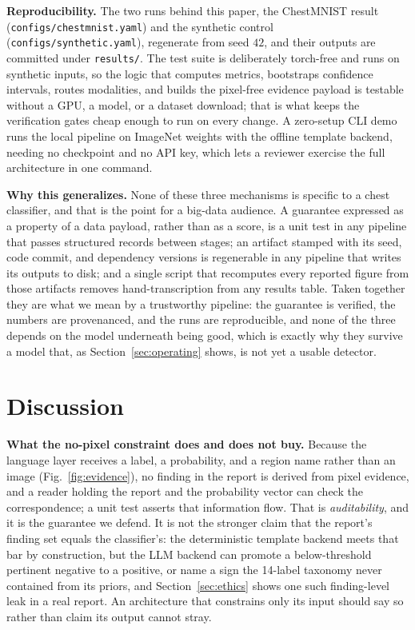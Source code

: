 \documentclass[conference]{IEEEtran}
\newcommand{\code}[1]{\texttt{\small #1}}
\newcommand{\rih}[1]{\textbf{#1}\enspace\ignorespaces}
\begin{document}
\rih{Reproducibility.} The two runs behind this paper, the ChestMNIST result
(\code{configs/chestmnist.yaml}) and the synthetic control
(\code{configs/synthetic.yaml}), regenerate from seed $42$, and their outputs are
committed under \code{results/}. The test suite is deliberately torch-free and runs
on synthetic inputs, so the logic that computes metrics, bootstraps confidence
intervals, routes modalities, and builds the pixel-free evidence payload is testable
without a GPU, a model, or a dataset download; that is what keeps the verification
gates
cheap enough to run on every change. A zero-setup CLI demo runs the local pipeline
on ImageNet weights with the offline template backend, needing no checkpoint and no
API key, which lets a reviewer exercise the full architecture in one command.

\rih{Why this generalizes.} None of these three mechanisms is specific to a chest
classifier, and that is the point for a big-data audience. A guarantee expressed as
a property of a data payload, rather than as a score, is a unit test in any pipeline
that passes structured records between stages; an artifact stamped with its seed,
code commit, and dependency versions is regenerable in any pipeline that writes its
outputs to disk; and a single script that recomputes every reported figure from
those artifacts removes hand-transcription from any results table. Taken together
they are what we mean by a trustworthy pipeline: the guarantee is verified, the
numbers are provenanced, and the runs are reproducible, and none of the three
depends on the model underneath being good, which is exactly why they survive a
model that, as Section~\ref{sec:operating} shows, is not yet a usable detector.

\section{Discussion}
\label{sec:discussion}

\rih{What the no-pixel constraint does and does not buy.} Because the language layer
receives a label, a probability, and a region name rather than an image
(Fig.~\ref{fig:evidence}), no finding in the report is derived from pixel evidence,
and a reader holding the report and the probability vector can check the
correspondence; a unit test asserts that information flow. That is
\emph{auditability}, and it is the guarantee we defend. It is not the stronger claim
that the report's finding set equals the classifier's: the deterministic template
backend meets that bar by construction, but the LLM backend can promote a
below-threshold pertinent negative to a positive, or name a sign the 14-label
taxonomy never contained from its priors, and Section~\ref{sec:ethics} shows one such
finding-level leak in a real report. An architecture that constrains only its input
should say so rather than claim its output cannot stray.
\end{document}
